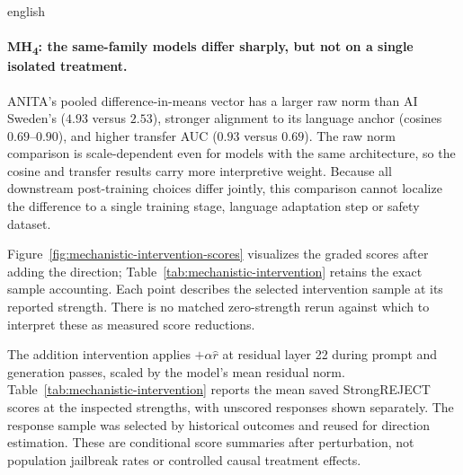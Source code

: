 \begin{otherlanguage*}{english}
\GradedMechanisticCorrelationTable

\paragraph*{MH\textsubscript{4}: the same-family models differ sharply, but not on a single isolated treatment.} ANITA's pooled difference-in-means vector has a larger raw norm than AI Sweden's ($4.93$ versus $2.53$), stronger alignment to its language anchor (cosines $0.69$--$0.90$), and higher transfer AUC ($0.93$ versus $0.69$). The raw norm comparison is scale-dependent even for models with the same architecture, so the cosine and transfer results carry more interpretive weight. Because all downstream post-training choices differ jointly, this comparison cannot localize the difference to a single training stage, language adaptation step or safety dataset.

\setcounter{secnumdepth}{3}

\clearpage
Figure~\ref{fig:mechanistic-intervention-scores} visualizes the graded scores after adding the direction; Table~\ref{tab:mechanistic-intervention} retains the exact sample accounting. Each point describes the selected intervention sample at its reported strength. There is no matched zero-strength rerun against which to interpret these as measured score reductions.


\GradedInterventionTable
{}

The addition intervention applies $+\alpha\hat{r}$ at residual layer 22 during prompt and generation passes, scaled by the model's mean residual norm. Table~\ref{tab:mechanistic-intervention} reports the mean saved StrongREJECT scores at the inspected strengths, with unscored responses shown separately. The response sample was selected by historical outcomes and reused for direction estimation. These are conditional score summaries after perturbation, not population jailbreak rates or controlled causal treatment effects.


\end{otherlanguage*}
